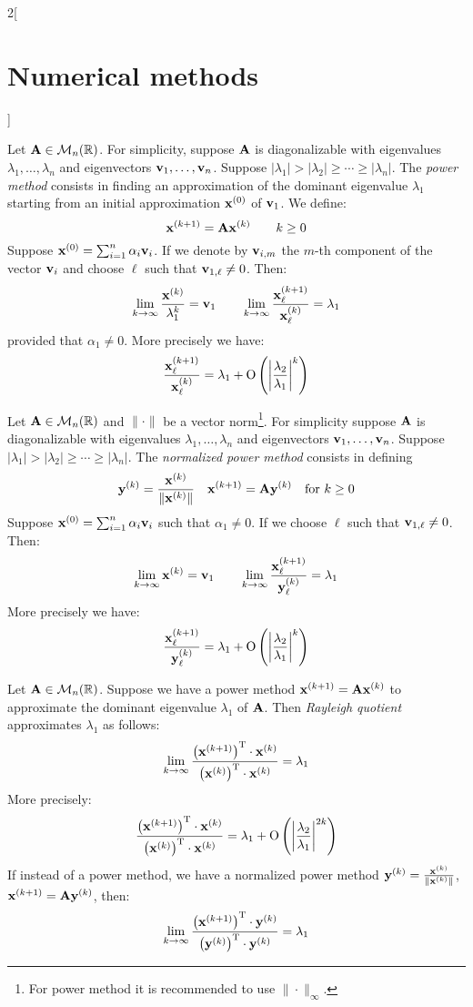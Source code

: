 \documentclass[../../../main_math.tex]{subfiles}
\begin{document}
\begin{multicols}{2}[\section{Numerical methods}]
\begin{proposition}
    Let $\boldsymbol{\mathrm{A}}\in\mathcal{M}_n(\mathbb{R})$. For simplicity, suppose $\boldsymbol{\mathrm{A}}$ is diagonalizable with eigenvalues $\lambda_1,\ldots,\lambda_n$ and eigenvectors $\boldsymbol{\mathrm{v}}_1,\ldots,\boldsymbol{\mathrm{v}}_n$. Suppose $|\lambda_1|>|\lambda_2|\geq\cdots\geq|\lambda_n|$. The \emph{power method} consists in finding an approximation of the dominant eigenvalue $\lambda_1$ starting from an initial approximation $\boldsymbol{\mathrm{x}}^{(0)}$ of $\boldsymbol{\mathrm{v}}_1$. We define: $$\boldsymbol{\mathrm{x}}^{(k+1)}=\boldsymbol{\mathrm{A}}\boldsymbol{\mathrm{x}}^{(k)}\qquad k\geq 0$$ Suppose $\boldsymbol{\mathrm{x}}^{(0)}=\sum_{i=1}^n\alpha_i\boldsymbol{\mathrm{v}}_i$. If we denote by $\boldsymbol{\mathrm{v}}_{i,m}$ the $m$-th component of the vector $\boldsymbol{\mathrm{v}}_i$ and choose $\ell$ such that $\boldsymbol{\mathrm{v}}_{1,\ell}\ne0$. Then: $$\lim_{k\to\infty}\frac{\boldsymbol{\mathrm{x}}^{(k)}}{\lambda_1^k}=\boldsymbol{\mathrm{v}}_1\qquad\lim_{k\to\infty}\frac{\boldsymbol{\mathrm{x}}_\ell^{(k+1)}}{\boldsymbol{\mathrm{x}}_\ell^{(k)}}=\lambda_1$$ provided that $\alpha_1\ne0$. More precisely we have: $$\frac{\boldsymbol{\mathrm{x}}_\ell^{(k+1)}}{\boldsymbol{\mathrm{x}}_\ell^{(k)}}=\lambda_1+\mathrm{O}\left(\left|\frac{\lambda_2}{\lambda_1}\right|^k\right)$$
  \end{proposition}
  \begin{proposition}
    Let $\boldsymbol{\mathrm{A}}\in\mathcal{M}_n(\mathbb{R})$ and $\|\cdot\|$ be a vector norm\footnote{For power method it is recommended to use $\|\cdot\|_\infty$.}. For simplicity suppose $\boldsymbol{\mathrm{A}}$ is diagonalizable with eigenvalues $\lambda_1,\ldots,\lambda_n$ and eigenvectors $\boldsymbol{\mathrm{v}}_1,\ldots,\boldsymbol{\mathrm{v}}_n$. Suppose $|\lambda_1|>|\lambda_2|\geq\cdots\geq|\lambda_n|$. The \emph{normalized power method} consists in defining $$\boldsymbol{\mathrm{y}}^{(k)}=\frac{\boldsymbol{\mathrm{x}}^{(k)}}{\|\boldsymbol{\mathrm{x}}^{(k)}\|}\quad\boldsymbol{\mathrm{x}}^{(k+1)}=\boldsymbol{\mathrm{A}}\boldsymbol{\mathrm{y}}^{(k)}\quad\text{for }k\geq 0$$ Suppose $\boldsymbol{\mathrm{x}}^{(0)}=\sum_{i=1}^n\alpha_i\boldsymbol{\mathrm{v}}_i$ such that $\alpha_1\ne0$. If we choose $\ell$ such that $\boldsymbol{\mathrm{v}}_{1,\ell}\ne0$. Then: $$\lim_{k\to\infty}\boldsymbol{\mathrm{x}}^{(k)}=\boldsymbol{\mathrm{v}}_1\qquad\lim_{k\to\infty}\frac{\boldsymbol{\mathrm{x}}_\ell^{(k+1)}}{\boldsymbol{\mathrm{y}}_\ell^{(k)}}=\lambda_1$$ More precisely we have: $$\frac{\boldsymbol{\mathrm{x}}_\ell^{(k+1)}}{\boldsymbol{\mathrm{y}}_\ell^{(k)}}=\lambda_1+\mathrm{O}\left(\left|\frac{\lambda_2}{\lambda_1}\right|^k\right)$$
  \end{proposition}
  \begin{proposition}
    Let $\boldsymbol{\mathrm{A}}\in\mathcal{M}_n(\mathbb{R})$. Suppose we have a power method $\boldsymbol{\mathrm{x}}^{(k+1)}=\boldsymbol{\mathrm{A}}\boldsymbol{\mathrm{x}}^{(k)}$ to approximate the dominant eigenvalue $\lambda_1$ of $\boldsymbol{\mathrm{A}}$. Then \emph{Rayleigh quotient} approximates $\lambda_1$ as follows: $$\lim_{k\to\infty}\frac{\left(\boldsymbol{\mathrm{x}}^{(k+1)}\right)^\mathrm{T}\cdot \boldsymbol{\mathrm{x}}^{(k)}}{\left(\boldsymbol{\mathrm{x}}^{(k)}\right)^\mathrm{T}\cdot\boldsymbol{\mathrm{x}}^{(k)}}=\lambda_1$$
    More precisely: $$\frac{\left(\boldsymbol{\mathrm{x}}^{(k+1)}\right)^\mathrm{T}\cdot \boldsymbol{\mathrm{x}}^{(k)}}{\left(\boldsymbol{\mathrm{x}}^{(k)}\right)^\mathrm{T}\cdot\boldsymbol{\mathrm{x}}^{(k)}}=\lambda_1+\mathrm{O}\left(\left|\frac{\lambda_2}{\lambda_1}\right|^{2k}\right)$$ If instead of a power method, we have a normalized power method $\boldsymbol{\mathrm{y}}^{(k)}=\frac{\boldsymbol{\mathrm{x}}^{(k)}}{\|\boldsymbol{\mathrm{x}}^{(k)}\|}$, $\boldsymbol{\mathrm{x}}^{(k+1)}=\boldsymbol{\mathrm{A}}\boldsymbol{\mathrm{y}}^{(k)}$, then: $$\lim_{k\to\infty}\frac{\left(\boldsymbol{\mathrm{x}}^{(k+1)}\right)^\mathrm{T}\cdot \boldsymbol{\mathrm{y}}^{(k)}}{\left(\boldsymbol{\mathrm{y}}^{(k)}\right)^\mathrm{T}\cdot\boldsymbol{\mathrm{y}}^{(k)}}=\lambda_1$$

\end{proposition}
\end{multicols}
\end{document}
